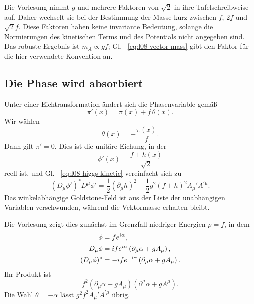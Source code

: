 Die Vorlesung nimmt \(g\) und mehrere Faktoren von \(\sqrt2\) in ihre Tafelschreibweise auf. Daher wechselt sie bei der Bestimmung der Masse kurz zwischen \(f\), \(2f\) und \(\sqrt2f\). Diese Faktoren haben keine invariante Bedeutung, solange die Normierungen des kinetischen Terms und des Potentials nicht angegeben sind. Das robuste Ergebnis ist \(m_A\propto gf\); Gl. ~\eqref{eq:l08-vector-mass} gibt den Faktor für die hier verwendete Konvention an.

\subsection{Die Phase wird absorbiert}

Unter einer Eichtransformation ändert sich die Phasenvariable gemäß
\begin{equation}
  \pi'(x)=\pi(x)+f\,\theta(x).
\end{equation}
Wir wählen
\begin{equation}
  \theta(x)=-\frac{\pi(x)}{f}.
  \label{eq:l08-unitary-gauge-choice}
\end{equation}
Dann gilt \(\pi'=0\). Dies ist die unitäre Eichung, in der \begin{equation}
  \phi'(x)=\frac{f+h(x)}{\sqrt2}
\end{equation} reell ist, und Gl. ~\eqref{eq:l08-higgs-kinetic} vereinfacht sich zu
\begin{equation}
  (D_\mu\phi')^*D^\mu\phi'
  =
  \frac12(\partial_\mu h)^2
  +\frac12g^2(f+h)^2A_\mu'A^{\prime\mu}.
  \label{eq:l08-unitary-gauge-lagrangian}
\end{equation}
Das winkelabhängige Goldstone-Feld ist aus der Liste der unabhängigen Variablen verschwunden, während die Vektormasse erhalten bleibt.

Die Vorlesung zeigt dies zunächst im Grenzfall niedriger Energien \(\rho=f\), in dem
\begin{align}
  \phi&=f e^{i\alpha},
  \notag\\
  D_\mu\phi
  &=if e^{i\alpha}
    \left(\partial_\mu\alpha+gA_\mu\right),
  \notag\\
  (D_\mu\phi)^*
  &=-if e^{-i\alpha}
    \left(\partial_\mu\alpha+gA_\mu\right).
  \label{eq:l08-frozen-radius}
\end{align}
Ihr Produkt ist
\begin{equation}
  f^2
  \left(\partial_\mu\alpha+gA_\mu\right)
  \left(\partial^\mu\alpha+gA^\mu\right).
\end{equation}
Die Wahl \(\theta=-\alpha\) lässt \(g^2f^2A_\mu'A^{\prime\mu}\) übrig.

